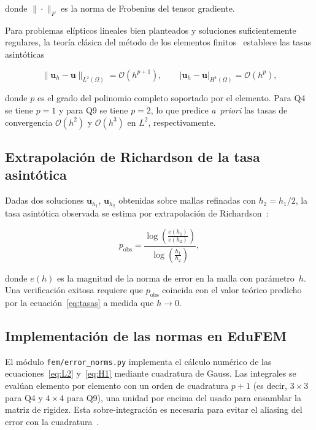 \noindent donde $\|\cdot\|_F$ es la norma de Frobenius del tensor gradiente.

Para problemas elípticos lineales bien planteados y soluciones suficientemente
regulares, la teoría clásica del método de los elementos
finitos~\cite{hughes2000finite,zienkiewicz2013finite,reddy2019fem} establece
las tasas asintóticas

\begin{equation}
  \|\mathbf{u}_h - \mathbf{u}\|_{L^2(\Omega)} =
    \mathcal{O}(h^{p+1}),
  \qquad
  |\mathbf{u}_h - \mathbf{u}|_{H^1(\Omega)} =
    \mathcal{O}(h^{p}),
  \label{eq:tasas}
\end{equation}

\noindent donde $p$ es el grado del polinomio completo soportado por el
elemento. Para Q4 se tiene $p=1$ y para Q9 se tiene $p=2$, lo que predice
\emph{a~priori} las tasas de convergencia $\mathcal{O}(h^2)$ y
$\mathcal{O}(h^3)$ en $L^2$, respectivamente.

\subsection{Extrapolación de Richardson de la tasa asintótica}

Dadas dos soluciones $\mathbf{u}_{h_1}$, $\mathbf{u}_{h_2}$ obtenidas sobre
mallas refinadas con $h_2 = h_1/2$, la tasa asintótica observada se estima
por extrapolación de Richardson~\cite{richardson1911extrapolation}:

\begin{equation}
  p_{\mathrm{obs}} =
  \dfrac{\log\!\left(\frac{e(h_1)}{e(h_2)}\right)}{\log\!\left(\frac{h_1}{h_2}\right)},
  \label{eq:rate}
\end{equation}

\noindent donde $e(h)$ es la magnitud de la norma de error en la malla con
parámetro~$h$. Una verificación exitosa requiere que $p_{\mathrm{obs}}$
coincida con el valor teórico predicho por la
ecuación~\eqref{eq:tasas} a medida que $h \to 0$.

\subsection{Implementación de las normas en EduFEM}

El módulo \verb|fem/error_norms.py| implementa el cálculo numérico de las
ecuaciones~\eqref{eq:L2} y~\eqref{eq:H1} mediante cuadratura de Gauss. Las
integrales se evalúan elemento por elemento con un orden de cuadratura
$p+1$ (es decir, $3\times 3$ para Q4 y $4\times 4$ para Q9), una unidad
por encima del usado para ensamblar la matriz de rigidez. Esta sobre-integración
es necesaria para evitar el aliasing del error con la
cuadratura~\cite{babuska2001finite}.

